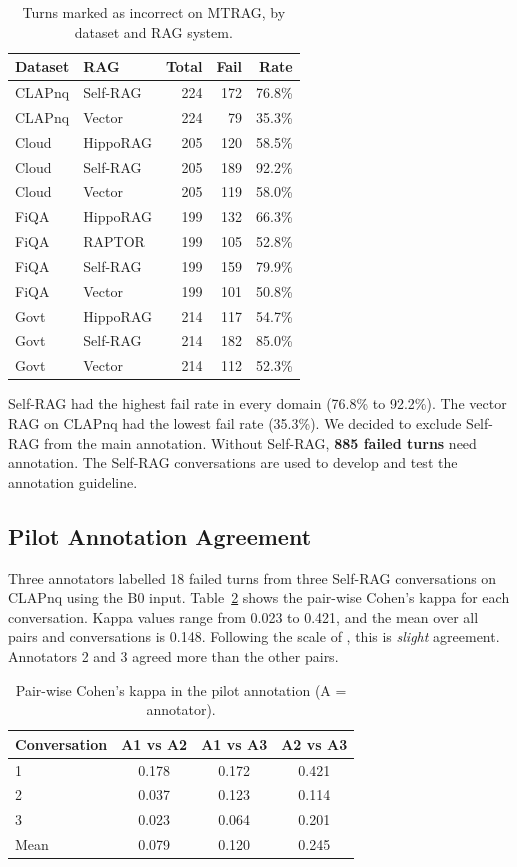 \documentclass[11pt]{article}
\begin{document}
\begin{table}[t]
\centering\small
\begin{tabular}{@{}l l r r r@{}}
\toprule
\textbf{Dataset} & \textbf{RAG} & \textbf{Total} & \textbf{Fail} & \textbf{Rate} \\
\midrule
CLAPnq & Self-RAG & 224 & 172 & 76.8\% \\
CLAPnq & Vector & 224 & 79 & 35.3\% \\
\midrule
Cloud & HippoRAG & 205 & 120 & 58.5\% \\
Cloud & Self-RAG & 205 & 189 & 92.2\% \\
Cloud & Vector & 205 & 119 & 58.0\% \\
\midrule
FiQA & HippoRAG & 199 & 132 & 66.3\% \\
FiQA & RAPTOR & 199 & 105 & 52.8\% \\
FiQA & Self-RAG & 199 & 159 & 79.9\% \\
FiQA & Vector & 199 & 101 & 50.8\% \\
\midrule
Govt & HippoRAG & 214 & 117 & 54.7\% \\
Govt & Self-RAG & 214 & 182 & 85.0\% \\
Govt & Vector & 214 & 112 & 52.3\% \\
\bottomrule
\end{tabular}
\caption{Turns marked as incorrect on MTRAG, by dataset and RAG system.}
\label{tab:mtrag}
\end{table}

Self-RAG had the highest fail rate in every domain (76.8\% to 92.2\%). The vector RAG on CLAPnq had the lowest fail rate (35.3\%). We decided to exclude Self-RAG from the main annotation. Without Self-RAG, \textbf{885 failed turns} need annotation. The Self-RAG conversations are used to develop and test the annotation guideline.

\subsection{Pilot Annotation Agreement}
Three annotators labelled 18 failed turns from three Self-RAG conversations on CLAPnq using the B0 input. Table~\ref{tab:kappa} shows the pair-wise Cohen's kappa for each conversation. Kappa values range from 0.023 to 0.421, and the mean over all pairs and conversations is 0.148. Following the scale of \citet{landis1977}, this is \emph{slight} agreement. Annotators 2 and 3 agreed more than the other pairs.

\begin{table}[t]
\centering\small
\begin{tabular}{@{}l c c c@{}}
\toprule
\textbf{Conversation} & \textbf{A1 vs A2} & \textbf{A1 vs A3} & \textbf{A2 vs A3} \\
\midrule
1 & 0.178 & 0.172 & 0.421 \\
2 & 0.037 & 0.123 & 0.114 \\
3 & 0.023 & 0.064 & 0.201 \\
\midrule
Mean & 0.079 & 0.120 & 0.245 \\
\bottomrule
\end{tabular}
\caption{Pair-wise Cohen's kappa in the pilot annotation (A = annotator).}
\label{tab:kappa}
\end{table}
\end{document}
